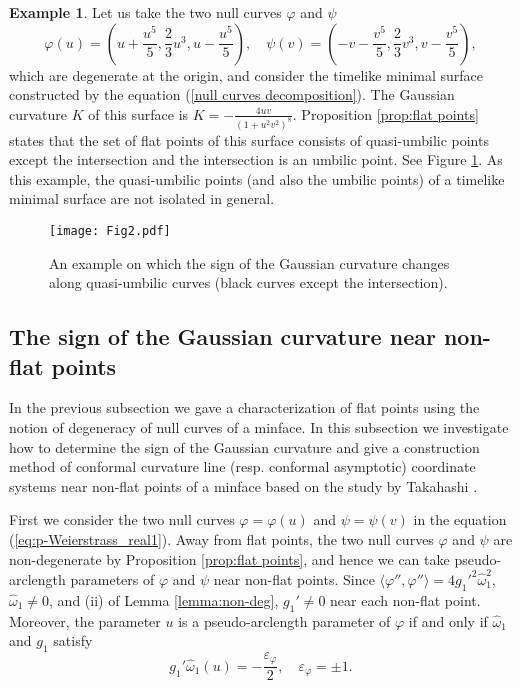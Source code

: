 \documentclass[11pt,reqno]{amsart}
\theoremstyle{plain} %
\theoremstyle{definition}
\newtheorem{example}[theorem]{Example}
\begin{document}
\begin{example}\label{ex:K-change}
Let us take the two null curves $\varphi$ and $\psi$
\begin{equation*}
\varphi(u)=\left(u+\frac{u^5}{5}, \frac{2}{3}u^3, u-\frac{u^5}{5}\right),\quad \psi(v)=\left(-v-\frac{v^5}{5}, \frac{2}{3}v^3, v-\frac{v^5}{5}\right),
\end{equation*}
which are degenerate at the origin, and consider the timelike minimal surface constructed by the equation (\ref{null curves decomposition}). The Gaussian curvature $K$ of this surface is $K=-\frac{4uv}{(1+u^2v^2)^8}$. Proposition \ref{prop:flat points} states that the set of flat points of this surface consists of quasi-umbilic points except the intersection and the intersection is an umbilic point. See Figure \ref{Fig2}. As this example, the quasi-umbilic points (and also the umbilic points) of a timelike minimal surface are not isolated in general. 
\begin{figure}[htbp]
 \vspace{-1.4cm}
\begin{center}
\texttt{[image: Fig2.pdf]}
\caption{An example on which the sign of the Gaussian curvature changes along quasi-umbilic curves (black curves except the intersection).}\label{Fig2}
\end{center}
\end{figure}
\end{example}

 \subsection{The sign of the Gaussian curvature near non-flat points}
In the previous subsection we gave a characterization of flat points using the notion of degeneracy of null curves of a minface. In this subsection we investigate how to determine the sign of the Gaussian curvature and give a construction method of conformal curvature line (resp. conformal asymptotic) coordinate systems near non-flat points of a minface based on the study by Takahashi \cite{T}.

First we consider the two null curves $\varphi=\varphi(u)$ and $\psi=\psi(v)$ in the equation (\ref{eq:p-Weierstrass_real1}). Away from flat points, the two null curves $\varphi$ and $\psi$ are non-degenerate by Proposition \ref{prop:flat points}, and hence we can take pseudo-arclength parameters of $\varphi$ and $\psi$ near non-flat points. Since $\langle \varphi'', \varphi'' \rangle =4{g_1'}^2\hat{\omega}_1^2$, $\hat{\omega}_1\neq 0$, and (ii) of Lemma \ref{lemma:non-deg}, $g_1'\neq0$ near each non-flat point. Moreover, the parameter $u$ is a pseudo-arclength parameter of $\varphi$ if and only if $\hat{\omega}_1$ and $g_1$ satisfy 
\begin{equation*}\label{eq:pseudo-arc-phi}
g_1'\hat{\omega}_1(u)=-\frac{\varepsilon_\varphi}{2},\quad \varepsilon_\varphi=\pm1.
\end{equation*}
\end{document}
